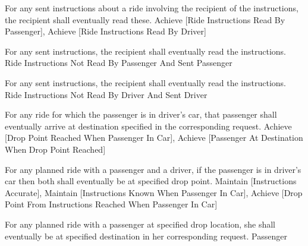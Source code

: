   \startkaosspec
  	 {For any sent instructions about a ride involving the recipient of the instructions, the recipient shall eventually read these.}
  	 {Achieve [Ride Instructions Read By Passenger], Achieve [Ride Instructions Read By Driver]}
  \stopkaosspec

  \startkaosspec
  	 {For any sent instructions, the recipient shall eventually read the instructions.}
  	 {Ride Instructions Not Read By Passenger And Sent}
  	 {Passenger}
  \stopkaosspec
  
  \startkaosspec
  	 {For any sent instructions, the recipient shall eventually read the instructions.}
  	 {Ride Instructions Not Read By Driver And Sent}
  	 {Driver}
  \stopkaosspec
  

    {}
  
  \startkaosspec
  	 {For any ride for which the passenger is in driver’s car, that passenger shall eventually arrive at destination specified in the corresponding request.}
  	 {Achieve [Drop Point Reached When Passenger In Car], Achieve [Passenger At Destination When Drop Point Reached]}
  \stopkaosspec
  
  \startkaosspec
  	 {For any planned ride with a passenger and a driver, if the passenger is in driver’s car then both shall eventually be at specified drop point.}
  	 {Maintain [Instructions Accurate], Maintain [Instructions Known When Passenger In Car], Achieve [Drop Point From Instructions Reached When Passenger In Car]}
  \stopkaosspec
  
  \startkaosspec
  	 {For any planned ride with a passenger at specified drop location, she shall eventually be at specified destination in her corresponding request.}
  	 {Passenger}
  \stopkaosspec
  
